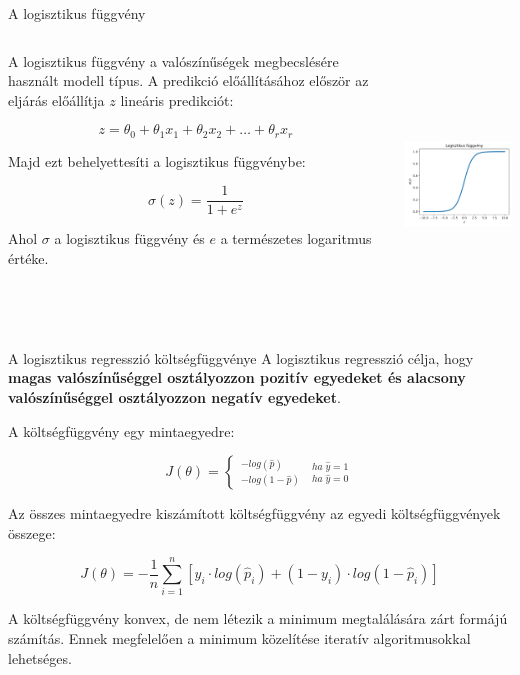 \documentclass[english, aspectratio=169]{beamer}
\begin{document}
\begin{frame}{A logisztikus függvény}
\begin{columns}
\begin{column}{.5\textwidth}
A logisztikus függvény a valószínűségek megbecslésére használt modell típus. A predikció előállításához először az eljárás előállítja $z$ lineáris predikciót:
\begin{block}{}
\vspace{-.6cm}
\[
z = \theta_0 + \theta_1x_1 + \theta_2x_2 + \ldots + \theta_rx_r
\]
\end{block}
Majd ezt behelyettesíti a logisztikus függvénybe: 
\begin{block}{}
\[
\sigma\left( z \right) = \frac{1}{1 + e^z}
\]
\end{block}
Ahol $\sigma$ a logisztikus függvény és $e$ a természetes logaritmus értéke. 
\end{column}
\begin{column}{.5\textwidth}
\begin{center}
\includegraphics[width=7cm, height=7cm, keepaspectratio]{images/osztalyozas_18.png}
\end{center}
\end{column}
\end{columns}
\end{frame}

\begin{frame}{A logisztikus regresszió költségfüggvénye}
A logisztikus regresszió célja, hogy \textbf{magas valószínűséggel osztályozzon pozitív egyedeket és alacsony valószínűséggel osztályozzon negatív egyedeket}.\par\smallskip
A költségfüggvény egy mintaegyedre: 
\begin{block}{}
\[
J\left( \theta \right) = \begin{cases}
_{-log\left(1-\hat{p}\right)}^{-log\left(\hat{p}\right)} & _{ha\;\hat{y}=0}^{ha\;\hat{y}=1}\end{cases}
\]
\end{block}
Az összes mintaegyedre kiszámított költségfüggvény az egyedi költségfüggvények összege:
\begin{block}{}
\[
J\left( \theta \right) = -\frac{1}{n} \sum_{i=1}^n \left[ y_i \cdot log \left( \hat{p}_i \right) + \left(1 - y_i \right) \cdot log \left( 1 - \hat{p}_i \right) \right]
\]
\end{block}
A költségfüggvény konvex, de nem létezik a minimum megtalálására zárt formájú számítás. Ennek megfelelően a minimum közelítése iteratív algoritmusokkal lehetséges.
\end{frame}
\end{document}
